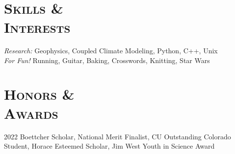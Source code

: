 \documentclass[11pt,line,letterpaper,margin]{res}
\begin{document}
\begin{resume}
                

                
                


\section{\textsc{Skills \&\\ Interests}} {\sl Research:} Geophysics, Coupled Climate Modeling, Python, C++, Unix \\ {\sl For Fun!} Running, Guitar, Baking, Crosswords, Knitting, Star Wars

\section{\scshape Honors \& \\ Awards} 2022 Boettcher Scholar, National Merit Finalist, CU Outstanding Colorado Student, Horace Esteemed Scholar, Jim West Youth in Science Award


\end{resume}
\end{document}
